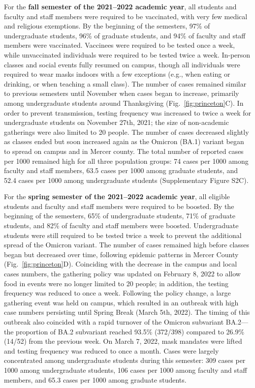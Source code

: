 \documentclass[12pt]{article}
\newcommand{\fref}[1]{Fig.~\ref{fig:#1}}
\begin{document}
For the \textbf{fall semester of the 2021--2022 academic year}, all students and faculty and staff members were required to be vaccinated, with very few medical and religious exemptions.
By the beginning of the semesters, 97\% of undergraduate students, 96\% of graduate students, and 94\% of faculty and staff members were vaccinated.
Vaccinees were required to be tested once a week, while unvaccinated individuals were required to be tested twice a week.
In-person classes and social events fully resumed on campus, though all individuals were required to wear masks indoors with a few exceptions (e.g., when eating or drinking, or when teaching a small class).
The number of cases remained similar to previous semesters until November when cases began to increase, primarily among undergraduate students around Thanksgiving (\fref{princeton}C).  
In order to prevent transmission, testing frequency was increased to twice a week for undergraduate students on November 27th, 2021; the size of non-academic gatherings were also limited to 20 people.
The number of cases decreased slightly as classes ended but soon increased again as the Omicron (BA.1) variant began to spread on campus and in Mercer county.
The total number of reported cases per 1000 remained high for all three population groups: 74 cases per 1000 among faculty and staff members, 63.5 cases per 1000 among graduate students, and 52.4 cases per 1000 among undergraduate students (Supplementary Figure S2C).

For the \textbf{spring semester of the 2021--2022 academic year}, all eligible students and faculty and staff members were required to be boosted.
By the beginning of the semesters, 65\% of undergraduate students, 71\% of graduate students, and 82\% of faculty and staff members were boosted.
Undergraduate students were still required to be tested twice a week to prevent the additional spread of the Omicron variant.
The number of cases remained high before classes began but decreased over time, following epidemic patterns in Mercer County (\fref{princeton}D).
Coinciding with the decrease in the campus and local cases numbers, the gathering policy was updated on February 8, 2022 to allow food in events were no longer limited to 20 people;
in addition, the testing frequency was reduced to once a week.
Following the policy change, a large gathering event was held on campus, which resulted in an outbreak with high case numbers persisting until Spring Break (March 5th, 2022).
The timing of this outbreak also coincided with a rapid turnover of the Omicron subvariant BA.2---the proportion of BA.2 subvariant reached 93.5\% (372/398) compared to 26.9\% (14/52) from the previous week.
On March 7, 2022, mask mandates were lifted and testing frequency was reduced to once a month.
Cases were largely concentrated among undergraduate students during this semester: 309 cases per 1000 among undergraduate students, 106 cases per 1000 among faculty and staff members, and 65.3 cases per 1000 among graduate students.
\end{document}
